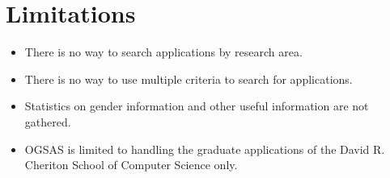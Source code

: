 \documentclass[titlepage]{article}
\begin{document}
\newpage
\section{Limitations}
\setcounter{figure}{0}

\begin{itemize}
\item There is no way to search applications by research area.
\item There is no way to use multiple criteria to search for applications.
\item Statistics on gender information and other useful information are not gathered.
\item OGSAS is limited to handling the graduate applications of the David R.
Cheriton School of Computer Science only.
\end{itemize}
\end{document}
